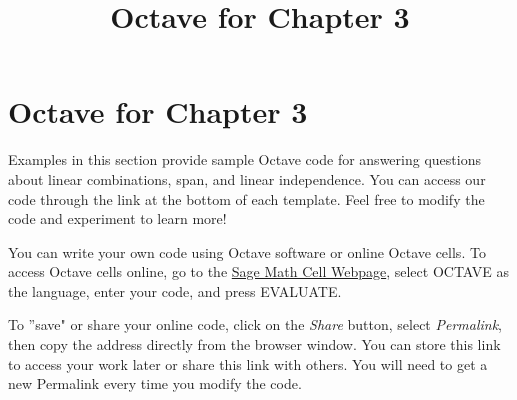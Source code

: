 \documentclass{ximera}
\title{Octave for Chapter 3} \license{CC BY-NC-SA 4.0}
\begin{document}
\begin{abstract}
\end{abstract}
\maketitle

\section*{Octave for Chapter 3}
Examples in this section provide sample Octave code for answering questions about linear combinations, span, and linear independence. You can access our code through the link at the bottom of each template.  Feel free to modify the code and experiment to learn more!  

You can write your own code using Octave software or online Octave cells.  To access Octave cells online, go to the \href{https://sagecell.sagemath.org/}{Sage Math Cell Webpage}, select OCTAVE as the language, enter your code, and press EVALUATE.  

To ''save" or share your online code, click on the \emph{Share} button, select \emph{Permalink}, then copy the address directly from the browser window.  You can store this link to access your work later or share this link with others.  You will need to get a new Permalink every time you modify the code.
\end{document}
